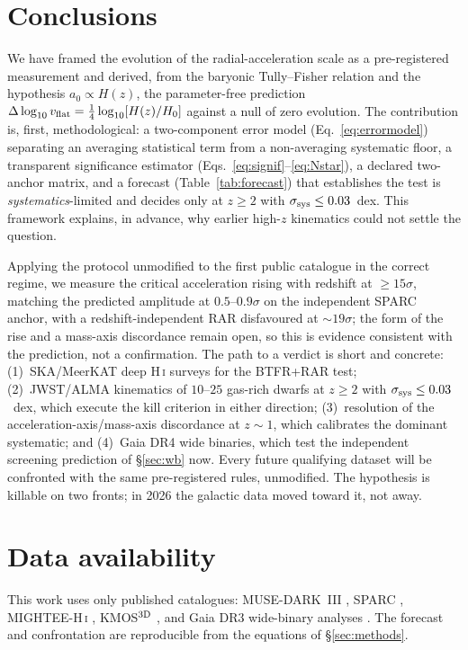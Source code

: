 \documentclass[fleqn,usenatbib]{mnras}
\newcommand{\dlogv}{\Delta\log_{10} v_{\rm flat}}
\newcommand{\azero}{a_0}
\newcommand{\ssys}{\sigma_{\rm sys}}
\begin{document}
\section{Conclusions}\label{sec:conclusions}

We have framed the evolution of the radial-acceleration scale as a pre-registered
measurement and derived, from the baryonic Tully--Fisher relation and the hypothesis
$\azero\propto H(z)$, the parameter-free prediction
$\dlogv=\tfrac14\log_{10}[H(z)/H_0]$ against a null of zero evolution. The
contribution is, first, methodological: a two-component error model
(Eq.~\ref{eq:errormodel}) separating an averaging statistical term from a
non-averaging systematic floor, a transparent significance estimator
(Eqs.~\ref{eq:signif}--\ref{eq:Nstar}), a declared two-anchor matrix, and a forecast
(Table~\ref{tab:forecast}) that establishes the test is \emph{systematics}-limited
and decides only at $z\ge2$ with $\ssys\le0.03$~dex. This framework explains, in
advance, why earlier high-$z$ kinematics could not settle the question.

Applying the protocol unmodified to the first public catalogue in the correct
regime, we measure the critical acceleration rising with redshift at $\ge15\sigma$,
matching the predicted amplitude at $0.5$--$0.9\sigma$ on the independent SPARC
anchor, with a redshift-independent RAR disfavoured at $\sim19\sigma$; the form of
the rise and a mass-axis discordance remain open, so this is evidence consistent
with the prediction, not a confirmation. The path to a verdict is short and concrete:
(1)~SKA/MeerKAT deep H\,\textsc{i} surveys for the BTFR+RAR test; (2)~JWST/ALMA
kinematics of $10$--$25$ gas-rich dwarfs at $z\ge2$ with $\ssys\le0.03$~dex, which
execute the kill criterion in either direction; (3)~resolution of the
acceleration-axis/mass-axis discordance at $z\sim1$, which calibrates the dominant
systematic; and (4)~Gaia DR4 wide binaries, which test the independent screening
prediction of \S\ref{sec:wb} now. Every future qualifying dataset will be confronted
with the same pre-registered rules, unmodified. The hypothesis is killable on two
fronts; in 2026 the galactic data moved toward it, not away.

\section*{Data availability}
This work uses only published catalogues: MUSE-DARK~III \citep{Ciocan2026}, SPARC
\citep{Lelli2016,McGaugh2016}, MIGHTEE-H\,\textsc{i} \citep{Varasteanu2025},
KMOS$^{3\rm D}$ \citep{Ubler2017}, and Gaia DR3 wide-binary analyses
\citep{Chae2023,BanikPittordis2024}. The forecast and confrontation are reproducible
from the equations of \S\ref{sec:methods}.




\bsp
\label{lastpage}
\end{document}
